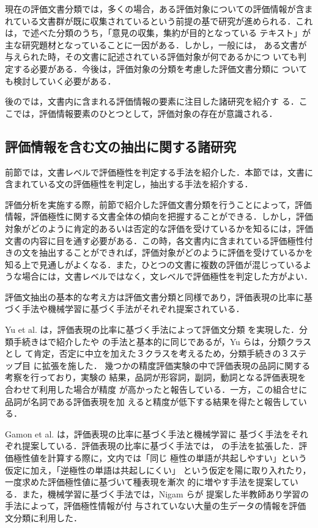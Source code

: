 現在の評価文書分類では，多くの場合，ある評価対象についての評価情報が含ま
れている文書群が既に収集されているという前提の基で研究が進められる．これ
は，で述べた分類のうち，「意見の収集，集約が目的となっている
テキスト」が主な研究題材となっていることに一因がある．しかし，一般には，
ある文書が与えられた時，その文書に記述されている評価対象が何であるかにつ
いても判定する必要がある．今後は，評価対象の分類を考慮した評価文書分類に
ついても検討していく必要がある．

後のでは，文書内に含まれる評価情報の要素に注目した諸研究を紹介す
る．ここでは，評価情報要素のひとつとして，評価対象の存在が意識される．

\subsection{評価情報を含む文の抽出に関する諸研究}
\label{sec:sc}

前節では，文書レベルで評価極性を判定する手法を紹介した．本節では，文書に
含まれている文の評価極性を判定し，抽出する手法を紹介する．

評価分析を実施する際，前節で紹介した評価文書分類を行うことによって，評価
情報，評価極性に関する文書全体の傾向を把握することができる．しかし，評価
対象がどのように肯定的あるいは否定的な評価を受けているかを知るには，評価
文書の内容に目を通す必要がある．この時，各文書内に含まれている評価極性付
きの文を抽出することができれば，評価対象がどのように評価を受けているかを
知る上で見通しがよくなる．また，ひとつの文書に複数の評価が混じっているよ
うな場合には，文書レベルではなく，文レベルで評価極性を判定した方がよい．

評価文抽出の基本的な考え方は評価文書分類と同様であり，評価表現の比率に基
づく手法や機械学習に基づく手法がそれぞれ提案されている．

Yu et al. \cite{yu2003a}は，評価表現の比率に基づく手法によって評価文分類
を実現した．分類手続きはで紹介した\cite{turney2002a}や
\cite{taboada2004a}の手法と基本的に同じであるが，Yu らは，分類クラスとし
て肯定，否定に中立を加えた３クラスを考えるため，分類手続きの３ステップ目
に拡張を施した．
幾つかの精度評価実験の中で評価表現の品詞に関する考察を行っており，実験の
結果，品詞が形容詞，副詞，動詞となる評価表現を合わせて利用した場合が精度
が高かったと報告している．一方，この組合せに品詞が名詞である評価表現を加
えると精度が低下する結果を得たと報告している．

Gamon et al. \cite{gamon2005a}は，評価表現の比率に基づく手法と機械学習に
基づく手法をそれぞれ提案している．評価表現の比率に基づく手法では，
\cite{yu2003a}の手法を拡張した．評価極性値を計算する際に，文内では「同じ
極性の単語が共起しやすい」という仮定に加え，「逆極性の単語は共起しにくい」
という仮定を陽に取り入れたり，一度求めた評価極性値に基づいて種表現を漸次
的に増やす手法を提案している．また，機械学習に基づく手法では，Nigam らが
提案した半教師あり学習の手法\cite{nigam2000a}によって，評価極性情報が付
与されていない大量の生データの情報を評価文分類に利用した．

